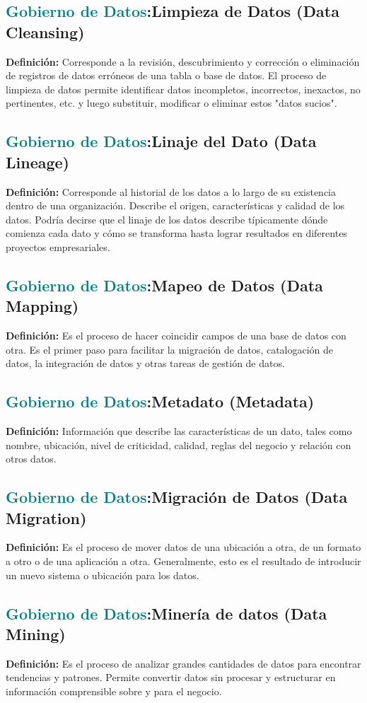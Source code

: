\documentclass[12pt]{article}
\begin{document}
\subsection{\textcolor{teal}{Gobierno de Datos}:{Limpieza de Datos (Data Cleansing)}}
\textbf{Definición:} Corresponde a la revisión, descubrimiento y corrección o eliminación de registros de datos erróneos de una tabla o base de datos. El proceso de limpieza de datos permite identificar datos incompletos, incorrectos, inexactos, no pertinentes, etc. y luego substituir, modificar o eliminar estos "datos sucios".
\subsection{\textcolor{teal}{Gobierno de Datos}:{Linaje del Dato (Data Lineage) }}
\textbf{Definición:} Corresponde al historial de los datos a lo largo de su existencia dentro de una organización. Describe el origen, características y calidad de los datos. Podría decirse que el linaje de los datos describe típicamente dónde comienza cada dato y cómo se transforma hasta lograr resultados en diferentes proyectos empresariales.
\subsection{\textcolor{teal}{Gobierno de Datos}:{Mapeo de Datos (Data Mapping)}}
\textbf{Definición:} Es el proceso de hacer coincidir campos de una base de datos con otra. Es el primer paso para facilitar la migración de datos, catalogación de datos, la integración de datos y otras tareas de gestión de datos.
\subsection{\textcolor{teal}{Gobierno de Datos}:{Metadato (Metadata)}}
\textbf{Definición:} Información que describe las características de un dato, tales como nombre, ubicación, nivel de criticidad, calidad, reglas del negocio y relación con otros datos.
\subsection{\textcolor{teal}{Gobierno de Datos}:{Migración de Datos (Data Migration)}}
\textbf{Definición:} Es el proceso de mover datos de una ubicación a otra, de un formato a otro o de una aplicación a otra. Generalmente, esto es el resultado de introducir un nuevo sistema o ubicación para los datos.
\subsection{\textcolor{teal}{Gobierno de Datos}:{Minería de datos (Data Mining)}}
\textbf{Definición:} Es el proceso de analizar grandes cantidades de datos para encontrar tendencias y patrones. Permite convertir datos sin procesar y estructurar en información comprensible sobre y para el negocio.  
\end{document}
